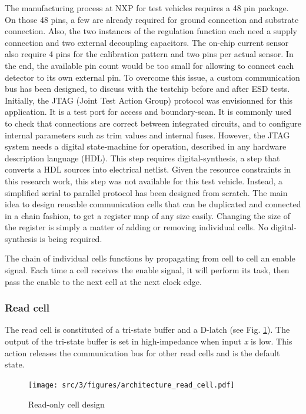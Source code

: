 The manufacturing process at NXP for test vehicles requires a 48 pin package.
On those 48 pins, a few are already required for ground connection and substrate connection.
Also, the two instances of the regulation function each need a supply connection and two external decoupling capacitors.
The on-chip current sensor also require 4 pins for the calibration pattern and two pins per actual sensor.
In the end, the available pin count would be too small for allowing to connect each detector to its own external pin.
To overcome this issue, a custom communication bus has been designed, to discuss with the testchip before and after ESD tests.
Initially, the JTAG (Joint Test Action Group) \cite{jtag} protocol was envisionned for this application.
It is a test port for access and boundary-scan.
It is commonly used to check that connections are correct between integrated circuits, and to configure internal parameters such as trim values and internal fuses.
However, the JTAG system needs a digital state-machine for operation, described in any hardware description language (HDL).
This step requires digital-synthesis, a step that converts a HDL sources into electrical netlist.
Given the resource constraints in this research work, this step was not available for this test vehicle.
Instead, a simplified serial to parallel protocol has been designed from scratch.
The main idea to design reusable communication cells that can be duplicated and connected in a chain fashion, to get a register map of any size easily.
Changing the size of the register is simply a matter of adding or removing individual cells.
No digital-synthesis is being required.

The chain of individual cells functions by propagating from cell to cell an enable signal.
Each time a cell receives the enable signal, it will perform its task, then pass the enable to the next cell at the next clock edge.

\subsubsection{Read cell}

The read cell is constituted of a tri-state buffer and a D-latch (see Fig. \ref{fig:read-cell-design}).
The output of the tri-state buffer is set in high-impedance when input \textit{x} is low.
This action releases the communication bus for other read cells and is the default state.

\begin{figure}[!h]
  \centering
  \texttt{[image: src/3/figures/architecture\_read\_cell.pdf]}
  \caption{Read-only cell design}
  \label{fig:read-cell-design}
\end{figure}

